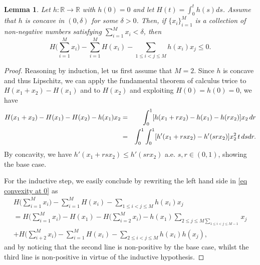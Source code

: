 \documentclass[11pt,letterpaper,reqno]{amsart}
\newcommand{\R}{\mathbb{R}}
\theoremstyle{plain}%
\newtheorem{lemma}[theorem]{Lemma}
\theoremstyle{definition}
\numberwithin{equation}{section}
\numberwithin{figure}{section}
\begin{document}
\begin{lemma}\label{lemma tailconcavity}
  Let $h:\R \to \R$ with $h(0)=0$ and let $H(t) = \int_0^t h(s)ds$. Assume that $h$ is concave in $(0,\delta)$ for some $\delta>0$. Then, if  $\{x_i\}_{i=1}^M$ is a collection of non-negative numbers satisfying $ \sum_{i=1}^M x_i <\delta$, then
 \begin{equation}\label{eq convexity at 0}
 	H\Big(\sum_{i=1}^M x_i\Big)- \sum_{i=1}^M H(x_i)-	\sum_{1\leq i < j \leq M} h(x_i) x_j \leq 0.
 \end{equation}
\end{lemma}
\begin{proof}
	Reasoning by induction, let us first assume that $M=2$. Since $h$ is concave and thus Lipschitz, we can apply the fundamental theorem of calculus twice to $H(x_1+x_2)-H(x_1)$ and to $H(x_2) $ and exploiting $H(0)=h(0)=0$, we have
	\begin{eqnarray}\notag
		H (x_1+x_2)-  H(x_1)-H(x_2)- h(x_1) x_2 &=& \int_0^1 [h(x_1+rx_2)-h(x_1)-h(rx_2)]x_2\, dr \\\notag
		&=& \int_0^1\int_0^1 [h'(x_1+rsx_2)-h'(srx_2)]x_2^2 \,t \, ds dr.
	\end{eqnarray}
By concavity, we have $h'(x_1+rsx_2) \leq h'(srx_2)$ a.e. $s, r \in (0,1)$, showing the base case.

For the inductive step, we easily conclude by rewriting the left hand side in \eqref{eq convexity at 0} as
\begin{eqnarray*}
 	H \Big(\sum_{i=1}^M x_i\Big)- \sum_{i=1}^M H(x_i)-	\sum_{1\leq i < j \leq M} h(x_i) x_j \\
 	= 	H \Big(\sum_{i=1}^{M} x_i\Big)-	H (x_1)- 	H \Big(\sum_{i=2}^{M} x_i\Big)-	 h(x_1)\sum_{2\leq j \leq M\sum_{1\leq i < j \leq M-1}} x_j \\
 	+ H \Big(\sum_{i+2}^{M} x_i\Big)-\sum_{i=1}^M H(x_i) -\sum_{2\leq i < j \leq M}h(x_i)h(x_j),
\end{eqnarray*}
and by noticing that the second line is non-positive by the base case, whilst the third line is non-positive in virtue of the inductive hypothesis.	
\end{proof}
\end{document}
